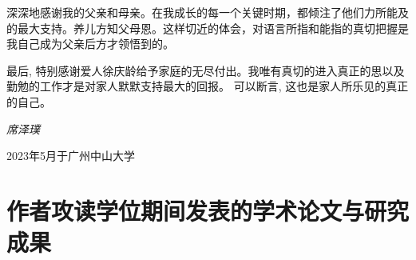 深深地感谢我的父亲和母亲。在我成长的每一个关键时期，都倾注了他们力所能及的最大支持。养儿方知父母恩。这样切近的体会，对语言所指和能指的真切把握是我自己成为父亲后方才领悟到的。

最后, 特别感谢爱人徐庆龄给予家庭的无尽付出。我唯有真切的进入真正的思以及勤勉的工作才是对家人默默支持最大的回报。 可以断言, 这也是家人所乐见的真正的自己。

\hfill \textit{席泽璞}

\hfill 2023年5月于广州中山大学


\chapter{作者攻读学位期间发表的学术论文与研究成果}
%
%
%

